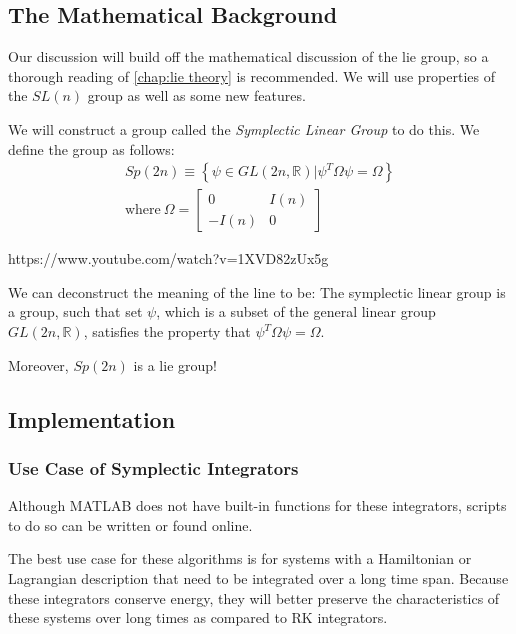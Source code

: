 \subsection{The Mathematical Background}
Our discussion will build off the mathematical discussion of the \gls{lie group}, so a thorough reading of \autoref{chap:lie theory} is recommended. We will use properties of the $SL(n)$ group as well as some new features.

We will construct a group called the \textit{Symplectic Linear Group} to do this. We define the group as follows:
\begin{gather}
    Sp(2n)\equiv\left\{\psi\in GL(2n,\mathbb{R})|\psi^T \Omega\psi=\Omega\right\}\\
    \mathrm{where  \ } \Omega=\begin{bmatrix}
        0&I(n)\\-I(n)&0
    \end{bmatrix}
\end{gather}


https://www.youtube.com/watch?v=1XVD82zUx5g

We can deconstruct the meaning of the line to be: The symplectic linear group is a group, such that set $\psi$, which is a subset of the general linear group $GL(2n,\mathbb{R})$, satisfies the property that $\psi^T \Omega\psi=\Omega$.

Moreover, $Sp(2n)$ is a \gls{lie group}!


\subsection{Implementation}


\subsubsection{Use Case of Symplectic Integrators}
Although MATLAB does not have built-in functions for these integrators, scripts to do so can be written or found online.

The best use case for these algorithms is for systems with a \gls{Hamiltonian} or \gls{Lagrangian} description that need to be integrated over a long time span. Because these integrators conserve energy, they will better preserve the characteristics of these systems over long times as compared to RK integrators.


\newpage
\printendnotes
